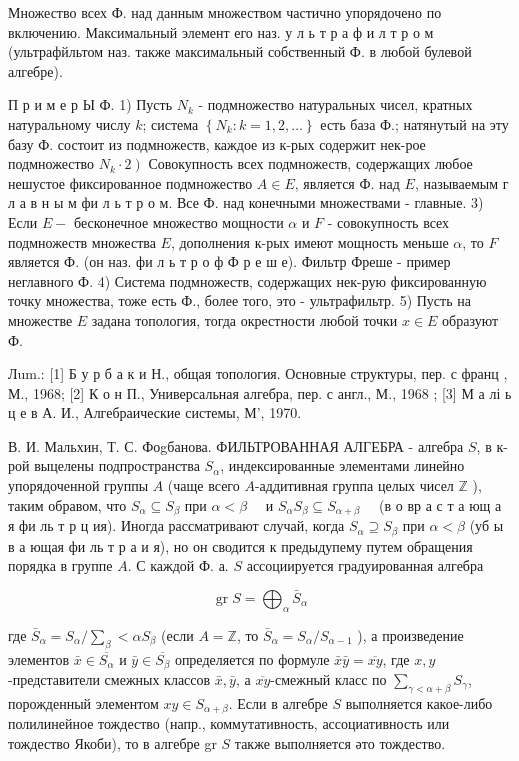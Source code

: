 \documentclass[10pt]{article}
\begin{document}
Множество всех Ф. над данным множеством частично упорядочено по включению. Максимальный элемент его наз. у л ь т р а ф и л т р о м (ультрафйльтом наз. также максимальный собственный Ф. в любой булевой алгебре).



П р и м е р Ы Ф. 1) Пусть $N_{k}$ - подмножество натуральных чисел, кратных натуральному числу $k$; система $\left\{N_{k}: k=1,2, \ldots\right\}$ есть база Ф.; натянутый на эту базу Ф. состоит из подмножеств, каждое из к-рых содержит нек-рое подмножество $\left.N_{k} \cdot 2\right)$ Совокупность всех подмножеств, содержащих любое нешустое фиксированное подмножество $A \in E$, является Ф. над $E$, называемым г л а в н ы м фи л ь т р о м. Все Ф. над конечными множествами - главные. 3) Если $E-$ бесконечное множество мощности $\alpha$ и $F$ - совокупность всех подмножеств множества $E$, дополнения к-рых имеют мощность меньше $\alpha$, то $F$ является Ф. (он наз. фи л ь т р о ф Ф р е ш е). Фильтр Фреше - пример неглавного Ф. 4) Система подмножеств, содержащих нек-рую фиксированную точку множества, тоже есть Ф., более того, это - ультрафильтр. 5) Пусть на множестве $E$ задана топология, тогда окрестности любой точки $x \in E$ образуют Ф.



Лum.: [1] Б у р б а к и Н., общая топология. Основные структуры, пер. с франц , М., 1968; [2] К о н П., Универсальная алгебра, пер. с англ., М., 1968 ; [3] М а лі ь ц е в А. И., Алгебраические системы, М', 1970.



В. И. Мальхин, Т. С. Фоgбанова. ФИЛЬТРОВАННАЯ АЛГЕБРА - алгебра $S$, в к-рой выцелены подпространства $S_{\alpha}$, индексированные элементами линейно упорядоченной группы $A$ (чаще всего $A$-аддитивная группа целых чисел $\mathbb{Z}$ ), таким обравом, что $S_{\alpha} \subseteq S_{\beta}$ при $\alpha<\beta \quad$ и $S_{\alpha} S_{\beta} \subseteq S_{\alpha+\beta} \quad$ (в о вр а с т а ющ а я фи ль т р ц ия). Иногда рассматривают случай, когда $S_{\alpha} \supseteq S_{\beta}$ при $\alpha<\beta$ (уб ы в а ющая фи ль т р а и я), но он сводится к предыдупему путем обращения порядка в группе $A$. С каждой Ф. а. $S$ ассоциируется градуированная алгебра



\[

\operatorname{gr} S=\bigoplus_{\alpha} \bar{S}_{\alpha}

\]



где $\bar{S}_{\alpha}=S_{\alpha} / \sum_{\beta}<\alpha S_{\beta}$ (если $A=\mathbb{Z}$, то $\bar{S}_{\alpha}=S_{\alpha} / S_{\alpha-1}$ ), а произведение элементов $\bar{x} \in \overline{S_{\alpha}}$ и $\bar{y} \in \overline{S_{\beta}}$ определяется по формуле $\bar{x} \bar{y}=\overline{x y}$, где $x, y$-представители смежных классов $\bar{x}, \bar{y}$, а $\overline{x y}$-смежный класс по $\sum_{\gamma<\alpha+\beta} S_{\gamma}$, порожденный элементом $x y \in S_{\alpha+\beta}$. Если в алгебре $S$ выполняется какое-либо полилинейное тождество (напр., коммутативность, ассоциативность или тождество Якоби), то в алгебре gr $S$ также выполняется әто тождество.
\end{document}
